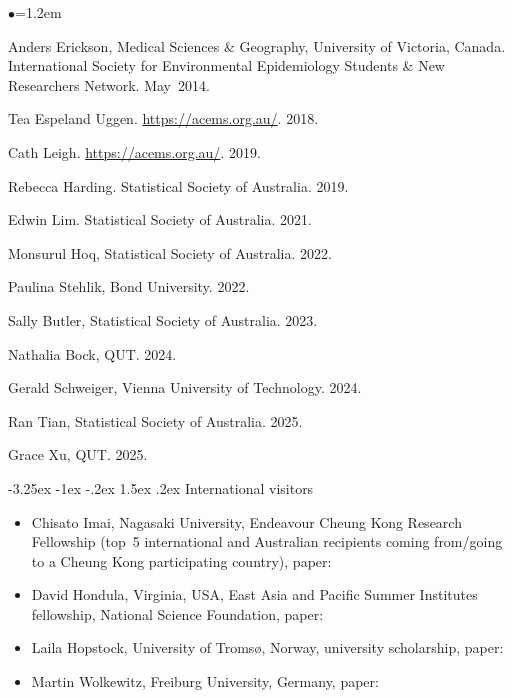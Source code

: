 \documentclass[a4paper,11pt]{article}
\makeatletter
\renewcommand\subsection{\@startsection{subsection}{2}{\z@}%
                                       {-3.25ex \@plus -1ex \@minus -.2ex}%
                                       {1.5ex \@plus .2ex}%
                                   {\normalfont\normalsize\bfseries\color{blue}}}
\renewcommand{\labelitemi}{$\bullet$}
\makeatother
\begin{document}
\begin{raggedright}
\begin{list}{\labelitemi}{\leftmargin=1.2em}\addtolength{\itemsep}{-0.5\baselineskip}
\item Anders Erickson, Medical Sciences \& Geography, University of Victoria, Canada. International Society for Environmental Epidemiology Students \& New Researchers Network. May~2014.
\item Tea Espeland Uggen. \href{ACEMS}{https://acems.org.au/}. 2018.
\item Cath Leigh. \href{ACEMS}{https://acems.org.au/}. 2019.
\item Rebecca Harding. Statistical Society of Australia. 2019.
\item Edwin Lim. Statistical Society of Australia. 2021.
\item Monsurul Hoq, Statistical Society of Australia. 2022.
\item Paulina Stehlik, Bond University. 2022.
\item Sally Butler, Statistical Society of Australia. 2023.
\item Nathalia Bock, QUT. 2024.
\item Gerald Schweiger, Vienna University of Technology. 2024.
\item Ran Tian, Statistical Society of Australia. 2025.
\item Grace Xu, QUT. 2025.
\end{list}

\subsection{International visitors}

\begin{itemize}%
  \item[2014] Chisato Imai, Nagasaki University, Endeavour Cheung Kong Research Fellowship (top~5 international and Australian recipients coming from/going to a Cheung Kong participating country), paper: 
  \item[2012] David Hondula, Virginia, USA, East Asia and Pacific Summer Institutes fellowship, National Science Foundation, paper: 
  \item[2011] Laila Hopstock, University of {T}roms{\o}, Norway, university scholarship, paper: 
  \item[2010] Martin Wolkewitz, Freiburg University, Germany, paper: 
\end{itemize}


\end{raggedright}
\end{document}
